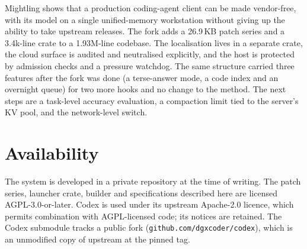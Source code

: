 \documentclass[11pt]{article}
\newcommand{\code}[1]{\texttt{#1}}
\begin{document}
Mightling shows that a production coding-agent client can be made vendor-free, with its model on a single
unified-memory workstation without giving up the ability to take upstream releases. The fork adds
a 26.9\,KB patch series and a 3.4k-line crate to a 1.93M-line codebase. The localisation lives in a separate crate, the cloud
surface is audited and neutralised explicitly, and the host is protected by admission checks and a
pressure watchdog. The same structure carried three features after the fork was done (a
terse-answer mode, a code index and an overnight queue) for two more hooks and no change to the
method. The next steps are a task-level accuracy evaluation, a compaction limit tied to the
server's KV pool, and the network-level switch.

\section*{Availability}
The system is developed in a private repository at the time of writing. The patch series, launcher
crate, builder and specifications described here are licensed AGPL-3.0-or-later. Codex is used
under its upstream Apache-2.0 licence, which permits combination with AGPL-licensed code; its
notices are retained. The Codex submodule tracks a public fork (\code{github.com/dgxcoder/codex}),
which is an unmodified copy of upstream at the pinned tag.



\end{document}
